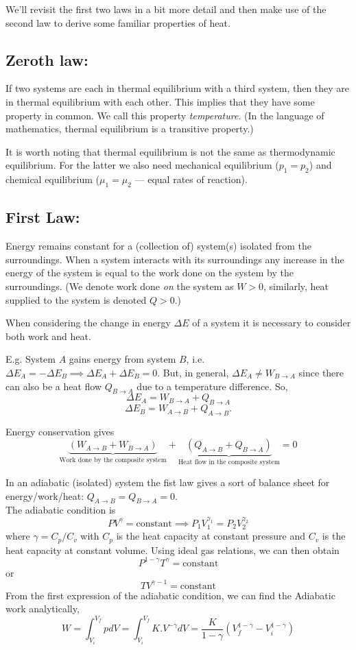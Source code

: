 \documentclass{article}
\begin{document}
We'll revisit the first two laws in a bit more detail and then make use of the second law to derive some familiar properties of heat.

\subsection{Zeroth law:}
If two systems are each in thermal equilibrium with a third system, then they are in thermal equilibrium with each other. This implies that they have some property in common. We call this property \emph{temperature}. (In the language of mathematics, thermal equilibrium is a transitive property.)

It is worth noting that thermal equilibrium is not the same as thermodynamic equilibrium. For the latter we also need mechanical equilibrium ($p_1=p_2$) and chemical equilibrium ($\mu_1=\mu_2$ --- equal rates of reaction).

\subsection{First Law:}
Energy remains constant for a (collection of) system(s) isolated from the surroundings. When a system interacts with its surroundings any increase in the energy of the system is equal to the work done on the system by the surroundings. (We denote work done \emph{on} the system as $W>0$, similarly, heat supplied to the system is denoted $Q>0$.)

When considering the change in energy $\Delta E$ of a system it is necessary to consider both work and heat.

E.g. System $A$ gains energy from system $B$, i.e. $\Delta E_A = -\Delta E_B \implies \Delta E_A + \Delta E_B =0$. But, in general, $\Delta E_A\neq W_{B\rightarrow A}$ since there can also be a heat flow $Q_{B\rightarrow A}$ due to a temperature difference.
So,
$$\Delta E_A = W_{B\rightarrow A} + Q_{B\rightarrow A}$$
$$\Delta E_B = W_{A\rightarrow B} + Q_{A\rightarrow B}.$$

Energy conservation gives 
$$\underbrace{(W_{A\rightarrow B}+W_{B\rightarrow A})}_{\text{Work done by the composite system}} + \underbrace{(Q_{A\rightarrow B}+Q_{B\rightarrow A})}_{\text{Heat flow in the composite system}} = 0$$

In an adiabatic (isolated) system the fist law gives a sort of balance sheet for energy/work/heat: $Q_{A\rightarrow B}=Q_{B\rightarrow A}=0$. \\

The adiabatic condition is $$PV^{\gamma} = \text{constant} \implies P_1V_1^{\gamma_1} = P_2V_2^{\gamma_2}$$ where $\gamma = C_p/C_v$ with $C_p$ is the heat capacity at constant pressure and $C_v$ is the heat capacity at constant volume. Using ideal gas relations, we can then obtain $$P^{1-\gamma}T^{\gamma} = \text{constant}$$ or $$TV^{\gamma-1} = \text{constant}$$
From the first expression of the adiabatic condition, we can find the Adiabatic work analytically,
$$W = \int^{V_f}_{V_i} p dV = \int^{V_f}_{V_i} K.V^{-\gamma} dV = \frac{K}{1-\gamma} \left(V_f^{1-\gamma} - V_i^{1-\gamma}\right)$$
\end{document}
